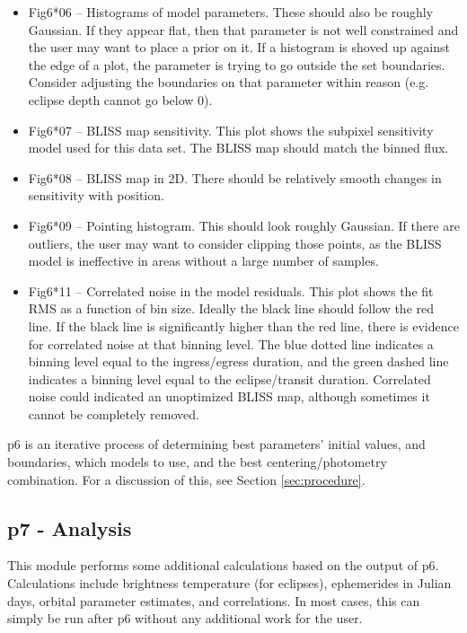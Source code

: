 \documentclass[letterpaper,12pt]{article}
\begin{document}
\begin{itemize}
\item Fig6*06 -- Histograms of model parameters. These should also be
  roughly Gaussian. If they appear flat, then that parameter is not well
  constrained and the user may want to place a prior on it. If a histogram
  is shoved up against the edge of a plot, the parameter is trying to
  go outside the set boundaries. Consider adjusting the boundaries on
  that parameter within reason (e.g. eclipse depth cannot go below 0).

\item Fig6*07 -- BLISS map sensitivity. This plot shows the subpixel
  sensitivity model used for this data set. The BLISS map should match
  the binned flux.

\item Fig6*08 -- BLISS map in 2D. There should be relatively smooth
  changes in sensitivity with position.

\item Fig6*09 -- Pointing histogram. This should look roughly
  Gaussian. If there are outliers, the user may want to consider
  clipping those points, as the BLISS model is ineffective in areas
  without a large number of samples.

\item Fig6*11 -- Correlated noise in the model residuals. This plot
  shows the fit RMS as a function of bin size. Ideally the black line
  should follow the red line. If the black line is significantly higher
  than the red line, there is evidence for correlated noise at that binning
  level. The blue dotted line indicates a binning level equal to the
  ingress/egress duration, and the green dashed line indicates a binning
  level equal to the eclipse/transit duration. Correlated noise
  could indicated an unoptimized BLISS map, although sometimes it cannot
  be completely removed.

\end{itemize}

p6 is an iterative process of determining best parameters' initial values,
and boundaries, which models to use, and the best centering/photometry
combination. For a discussion of this, see Section \ref{sec:procedure}.

\subsection{p7 - Analysis}
\label{sec:p7}
This module performs some additional calculations based on the output of p6.
Calculations include brightness temperature (for eclipses), ephemerides
in Julian days, orbital parameter estimates, and correlations. In most cases,
this can simply be run after p6 without any additional work for the user.
\end{document}
